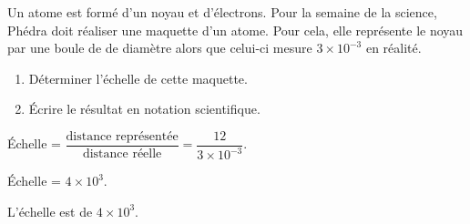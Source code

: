     Un atome est formé d’un noyau et d’électrons. Pour la semaine de la science, Phédra doit réaliser
    une maquette d’un atome. Pour cela, elle représente le noyau par une boule de  de diamètre alors
    que celui-ci mesure $3 \times 10^{-3}$ \Lg{} en réalité.

    \begin{enumerate}
        \item Déterminer l’échelle de cette maquette.
        \item Écrire le résultat en notation scientifique.
    \end{enumerate}

    {\red
    Échelle = $\dfrac{\text{distance représentée}}{\text{distance réelle}}=\dfrac{12}{3\times 10^{-3}}$.

    Échelle = $4\times 10^3$.

    L'échelle est de $4\times 10^3$.
    }
